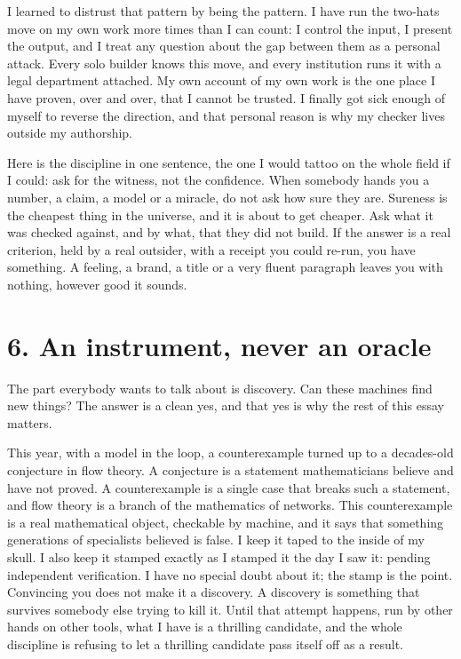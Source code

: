 \documentclass[11pt]{article}
\begin{document}
I learned to distrust that pattern by being the pattern. I have run the two-hats move on my own work more times than I can count: I control the input, I present the output, and I treat any question about the gap between them as a personal attack. Every solo builder knows this move, and every institution runs it with a legal department attached. My own account of my own work is the one place I have proven, over and over, that I cannot be trusted. I finally got sick enough of myself to reverse the direction, and that personal reason is why my checker lives outside my authorship.

Here is the discipline in one sentence, the one I would tattoo on the whole field if I could: ask for the witness, not the confidence. When somebody hands you a number, a claim, a model or a miracle, do not ask how sure they are. Sureness is the cheapest thing in the universe, and it is about to get cheaper. Ask what it was checked against, and by what, that they did not build. If the answer is a real criterion, held by a real outsider, with a receipt you could re-run, you have something. A feeling, a brand, a title or a very fluent paragraph leaves you with nothing, however good it sounds.

\section*{6. An instrument, never an oracle}

The part everybody wants to talk about is discovery. Can these machines find new things? The answer is a clean yes, and that yes is why the rest of this essay matters.

This year, with a model in the loop, a counterexample turned up to a decades-old conjecture in flow theory. A conjecture is a statement mathematicians believe and have not proved. A counterexample is a single case that breaks such a statement, and flow theory is a branch of the mathematics of networks. This counterexample is a real mathematical object, checkable by machine, and it says that something generations of specialists believed is false. I keep it taped to the inside of my skull. I also keep it stamped exactly as I stamped it the day I saw it: pending independent verification. I have no special doubt about it; the stamp is the point. Convincing you does not make it a discovery. A discovery is something that survives somebody else trying to kill it. Until that attempt happens, run by other hands on other tools, what I have is a thrilling candidate, and the whole discipline is refusing to let a thrilling candidate pass itself off as a result.
\end{document}

